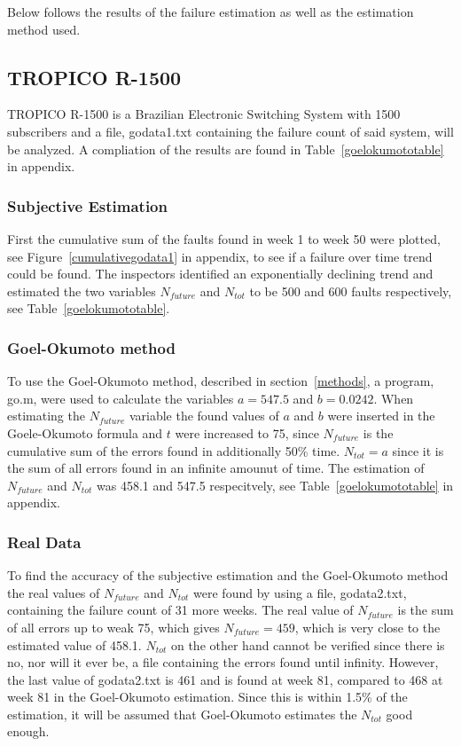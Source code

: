Below follows the results of the failure estimation as well as the estimation method used.

\subsection{TROPICO R-1500}
TROPICO R-1500 is a Brazilian Electronic Switching System with 1500 subscribers and a file, godata1.txt containing the failure count of said system, will be analyzed. A compliation of the results are found in Table~\ref{goelokumototable} in appendix.
\subsubsection*{Subjective Estimation} 
First the cumulative sum of the faults found in week 1 to week 50 were plotted, see Figure~\ref{cumulativegodata1} in appendix, to see if a failure over time trend could be found.
The inspectors identified an exponentially declining trend and estimated the two variables $N_{future}$ and $N_{tot}$ to be 500 and 600 faults respectively, see Table~\ref{goelokumototable}. 
\subsubsection*{Goel-Okumoto method}
To use the Goel-Okumoto method, described in section~\ref{methods}, a program, go.m, were used to calculate the variables $a=547.5$ and $b=0.0242$.
When estimating the $N_{future}$ variable the found values of $a$ and $b$ were inserted in the Goele-Okumoto formula and $t$ were increased to 75, since $N_{future}$ is the cumulative sum of the errors found in additionally 50\% time. 
$N_{tot} = a$ since it is the sum of all errors found in an infinite amounut of time.
The estimation of $N_{future}$ and $N_{tot}$ was 458.1 and 547.5 respecitvely, see Table~\ref{goelokumototable} in appendix.
\subsubsection*{Real Data}
\label{realdatago}
To find the accuracy of the subjective estimation and the Goel-Okumoto method the real values of $N_{future}$ and $N_{tot}$ were found by using a file, godata2.txt, containing the failure count of 31 more weeks. 
The real value of $N_{future}$ is the sum of all errors up to weak 75, which gives $N_{future}=459$, which is very close to the estimated value of 458.1. $N_{tot}$ on the other hand cannot be verified since there is no, nor will it ever be, a file containing the errors found until infinity. However, the last value of godata2.txt is 461 and is found at week 81, compared to 468 at week 81 in the Goel-Okumoto estimation. Since this is within 1.5\% of the estimation, it will be assumed that Goel-Okumoto estimates the $N_{tot}$ good enough.



